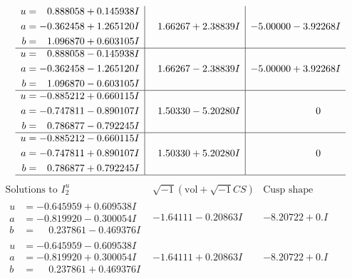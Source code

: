 \documentclass[1p]{elsarticle_modified}
\theoremstyle{definition}
\newcommand{\I}{\sqrt{-1}}
\begin{document}
$$\begin{array}{c|c|c}
\begin{aligned}
u &= \phantom{-}0.888058 + 0.145938 I \\
a &= -0.362458 + 1.265120 I \\
b &= \phantom{-}1.096870 + 0.603105 I\end{aligned}
 & \phantom{-}1.66267 + 2.38839 I & -5.00000 - 3.92268 I \\ \hline\begin{aligned}
u &= \phantom{-}0.888058 - 0.145938 I \\
a &= -0.362458 - 1.265120 I \\
b &= \phantom{-}1.096870 - 0.603105 I\end{aligned}
 & \phantom{-}1.66267 - 2.38839 I & -5.00000 + 3.92268 I \\ \hline\begin{aligned}
u &= -0.885212 + 0.660115 I \\
a &= -0.747811 - 0.890107 I \\
b &= \phantom{-}0.786877 - 0.792245 I\end{aligned}
 & \phantom{-}1.50330 - 5.20280 I & \phantom{-0.000000 } 0 \\ \hline\begin{aligned}
u &= -0.885212 - 0.660115 I \\
a &= -0.747811 + 0.890107 I \\
b &= \phantom{-}0.786877 + 0.792245 I\end{aligned}
 & \phantom{-}1.50330 + 5.20280 I & \phantom{-0.000000 } 0\\
 \hline 
 \end{array}$$\newpage$$\begin{array}{c|c|c}  
\text{Solutions to }I^u_{2}& \I (\text{vol} + \sqrt{-1}CS) & \text{Cusp shape}\\
 \hline 
\begin{aligned}
u &= -0.645959 + 0.609538 I \\
a &= -0.819920 - 0.300054 I \\
b &= \phantom{-}0.237861 - 0.469376 I\end{aligned}
 & -1.64111 - 0.20863 I & -8.20722 + 0. I\phantom{ +0.000000I} \\ \hline\begin{aligned}
u &= -0.645959 - 0.609538 I \\
a &= -0.819920 + 0.300054 I \\
b &= \phantom{-}0.237861 + 0.469376 I\end{aligned}
 & -1.64111 + 0.20863 I & -8.20722 + 0. I\phantom{ +0.000000I} \\ \hline\begin{aligned}

\end{aligned}
\end{array}$$
\end{document}
